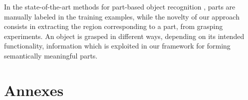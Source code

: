 \documentclass[a4paper,11pt,pdf]{pacmanreport}
\begin{document}
In the state-of-the-art methods for part-based object recognition 
\cite{part2,part3,part1}, parts are manually labeled in the training examples, 
while the novelty of our approach consists in extracting the region 
corresponding to a part, from grasping experiments. An object is grasped in 
different ways, depending on its intended functionality, information which is 
exploited in our framework for forming semantically meaningful parts.

\newpage




\newpage

\appendix

\section{Annexes}

\end{document}
